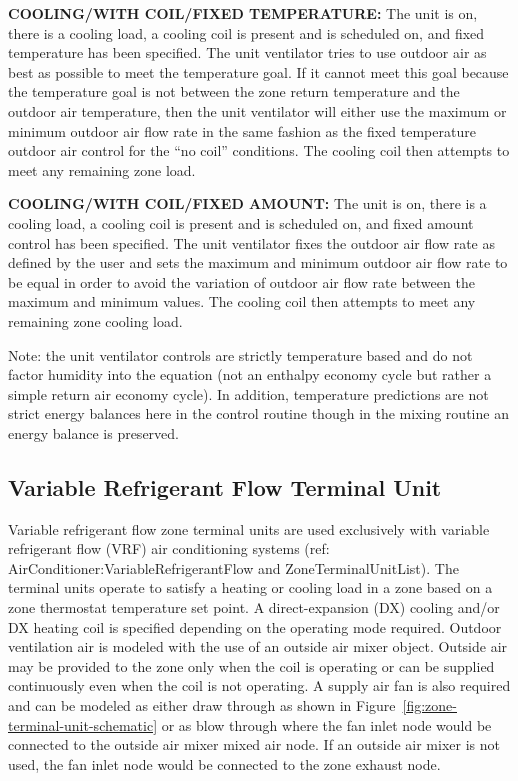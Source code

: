 \textbf{COOLING/WITH COIL/FIXED TEMPERATURE:} The unit is on, there is a cooling load, a cooling coil is present and is scheduled on, and fixed temperature has been specified. The unit ventilator tries to use outdoor air as best as possible to meet the temperature goal. If it cannot meet this goal because the temperature goal is not between the zone return temperature and the outdoor air temperature, then the unit ventilator will either use the maximum or minimum outdoor air flow rate in the same fashion as the fixed temperature outdoor air control for the ``no coil'' conditions. The cooling coil then attempts to meet any remaining zone load.

\textbf{COOLING/WITH COIL/FIXED AMOUNT:} The unit is on, there is a cooling load, a cooling coil is present and is scheduled on, and fixed amount control has been specified. The unit ventilator fixes the outdoor air flow rate as defined by the user and sets the maximum and minimum outdoor air flow rate to be equal in order to avoid the variation of outdoor air flow rate between the maximum and minimum values. The cooling coil then attempts to meet any remaining zone cooling load.

Note: the unit ventilator controls are strictly temperature based and do not factor humidity into the equation (not an enthalpy economy cycle but rather a simple return air economy cycle). In addition, temperature predictions are not strict energy balances here in the control routine though in the mixing routine an energy balance is preserved.

\subsection{Variable Refrigerant Flow Terminal Unit}\label{variable-refrigerant-flow-terminal-unit}

Variable refrigerant flow zone terminal units are used exclusively with variable refrigerant flow (VRF) air conditioning systems (ref: AirConditioner:VariableRefrigerantFlow and ZoneTerminalUnitList). The terminal units operate to satisfy a heating or cooling load in a zone based on a zone thermostat temperature set point. A direct-expansion (DX) cooling and/or DX heating coil is specified depending on the operating mode required. Outdoor ventilation air is modeled with the use of an outside air mixer object. Outside air may be provided to the zone only when the coil is operating or can be supplied continuously even when the coil is not operating. A supply air fan is also required and can be modeled as either draw through as shown in Figure~\ref{fig:zone-terminal-unit-schematic} or as blow through where the fan inlet node would be connected to the outside air mixer mixed air node. If an outside air mixer is not used, the fan inlet node would be connected to the zone exhaust node.

